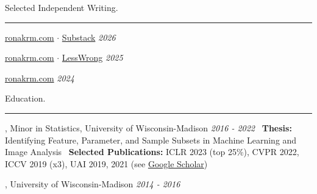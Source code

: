 \documentclass[]{article}
\newif\ifpolicy
\begin{document}
\vspace{5pt}
{\LARGE Selected Independent Writing.}
\vspace{3pt}
\hrule
\vspace{10pt}

 \href{https://ronakrm.com/coordinal-postmortem/}{ronakrm.com} $\cdot$ \href{https://ronakrm.substack.com/p/coordinal-a-postmortem}{Substack} \hfill \textit{2026}

 \href{https://ronakrm.com/interp-design/}{ronakrm.com} $\cdot$ \href{https://www.lesswrong.com/posts/kjL9req2p79nSNe5H/interpretable-by-design-constraint-sets-with-disjoint-limit}{LessWrong} \hfill \textit{2025}

 \href{https://ronakrm.com/interpretability-science/}{ronakrm.com} \hfill \textit{2024}

\ifpolicy
\vspace{10pt}
{\LARGE Volunteer \& Advocacy.}
\vspace{3pt}
\hrule
\vspace{10pt}

\noindent {\bf Organization} (TODO), Role \hfill \textit{Dates}
\begin{itemize}[label={$\bullet$}]
	\item TODO: what you organized, scale, outcome.
\end{itemize}
\fi

\vspace{10pt}
{\LARGE Education.}
\vspace{3pt}
\hrule
\vspace{10pt}

, Minor in Statistics, University of Wisconsin-Madison \hfill \textit{2016 - 2022} \newline
\ \indent \textbf{Thesis:} Identifying Feature, Parameter, and Sample Subsets in Machine Learning and Image Analysis \newline
\ \indent \textbf{Selected Publications:} ICLR 2023 (top 25\%), CVPR 2022, ICCV 2019 (x3), UAI 2019, 2021 (see \href{https://scholar.google.com/citations?user=zFRqln4AAAAJ&hl=en}{Google Scholar})

, University of Wisconsin-Madison \hfill \textit{2014 - 2016}
\end{document}
